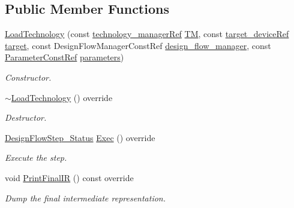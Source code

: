 \subsection*{Public Member Functions}
\begin{DoxyCompactItemize}
\item 
\hyperlink{classLoadTechnology_ab08684eff1b058d69b11e84ee37c89b5}{Load\+Technology} (const \hyperlink{technology__manager_8hpp_a4b9ecd440c804109c962654f9227244e}{technology\+\_\+manager\+Ref} \hyperlink{classTechnologyFlowStep_a4aeea30129ed65348c3bad932b3a135b}{TM}, const \hyperlink{target__device_8hpp_acedb2b7a617e27e6354a8049fee44eda}{target\+\_\+device\+Ref} \hyperlink{classTechnologyFlowStep_a1a16880c55bddc3f9dbc495636d7a8cb}{target}, const Design\+Flow\+Manager\+Const\+Ref \hyperlink{classDesignFlowStep_ab770677ddf087613add30024e16a5554}{design\+\_\+flow\+\_\+manager}, const \hyperlink{Parameter_8hpp_a37841774a6fcb479b597fdf8955eb4ea}{Parameter\+Const\+Ref} \hyperlink{classDesignFlowStep_a802eaafe8013df706370679d1a436949}{parameters})
\begin{DoxyCompactList}\small\item\em Constructor. \end{DoxyCompactList}\item 
\hyperlink{classLoadTechnology_adf6d3c4e1b43fed8a78ea25d760d32c8}{$\sim$\+Load\+Technology} () override
\begin{DoxyCompactList}\small\item\em Destructor. \end{DoxyCompactList}\item 
\hyperlink{design__flow__step_8hpp_afb1f0d73069c26076b8d31dbc8ebecdf}{Design\+Flow\+Step\+\_\+\+Status} \hyperlink{classLoadTechnology_a53cfdf06974770ede80309e27d2e0a15}{Exec} () override
\begin{DoxyCompactList}\small\item\em Execute the step. \end{DoxyCompactList}\item 
void \hyperlink{classLoadTechnology_a4f0526d4eb5b2a5be97a670e9ad580e2}{Print\+Final\+IR} () const override
\begin{DoxyCompactList}\small\item\em Dump the final intermediate representation. \end{DoxyCompactList}\end{DoxyCompactItemize}
